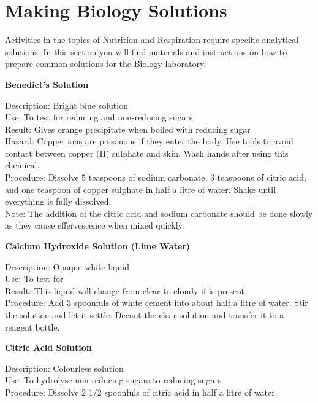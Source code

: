 \chapter{Making Biology Solutions} 
Activities in the topics of Nutrition and Respiration require specific analytical solutions. In this section you will find materials and instructions on how to prepare common solutions for the Biology laboratory.


\begin{flushleft}
\textbf{Benedict's Solution} 
\end{flushleft}
\vspace{-9pt}
Description: Bright blue solution\\
Use: To test for reducing and non-reducing sugars\\
Result: Gives orange precipitate when boiled with reducing sugar\\
Hazard: Copper ions are poisonous if they enter the body. Use tools to avoid contact between copper (II) sulphate and skin. Wash hands after using this chemical.\\
Procedure: Dissolve 5 teaspoons of sodium carbonate, 3 teaspoons of citric acid,
and one teaspoon of copper sulphate in half a litre of water. Shake until everything is fully dissolved.\\Note: The addition of the citric acid and sodium carbonate should be done slowly as they cause effervescence when mixed quickly.\\

\begin{flushleft}
\textbf{Calcium Hydroxide Solution (Lime Water)}  
\end{flushleft}
\vspace{-9pt}
Description: Opaque white liquid\\
Use: To test for \\
Result: This liquid will change from clear to cloudy if  is present.\\
Procedure: Add 3 spoonfuls of white cement into about half a litre of water. Stir the solution and let it settle. Decant the clear solution and transfer it to a reagent bottle.\\

\begin{flushleft}
\textbf{Citric Acid Solution} 
\end{flushleft}
\vspace{-9pt}
Description: Colourless solution\\
Use: To hydrolyse non-reducing sugars to reducing sugars\\
Procedure: Dissolve 2 1/2 spoonfuls of citric acid in half a litre of water.\\


